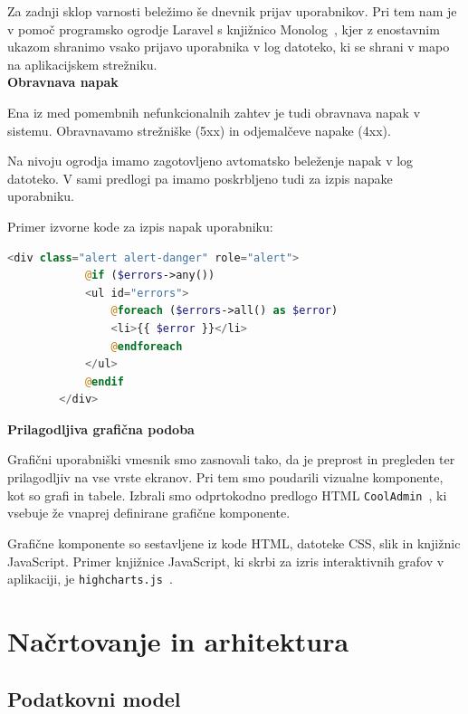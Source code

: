 \documentclass[a4paper, 12pt]{book}
\begin{document}
Za zadnji sklop varnosti beležimo še dnevnik prijav uporabnikov. Pri tem nam je v pomoč programsko ogrodje Laravel s knjižnico Monolog~\cite{laravel-monolog}, kjer z enostavnim ukazom shranimo vsako prijavo uporabnika v log datoteko, ki se shrani v mapo na aplikacijskem strežniku. \\

\noindent \textbf{Obravnava napak}

Ena iz med pomembnih nefunkcionalnih zahtev je tudi obravnava napak v sistemu. Obravnavamo strežniške (5xx) in odjemalčeve napake (4xx). 


Na nivoju ogrodja imamo zagotovljeno avtomatsko beleženje napak v log datoteko. V sami predlogi pa imamo poskrbljeno tudi za izpis napake uporabniku.

Primer izvorne kode za izpis napak uporabniku:

\begin{lstlisting}[language=PHP, style=mystyle]
        <div class="alert alert-danger" role="alert">
            @if ($errors->any())
            <ul id="errors">
                @foreach ($errors->all() as $error)
                <li>{{ $error }}</li>
                @endforeach
            </ul>
            @endif
        </div>
\end{lstlisting}

\vspace{5mm}

\noindent \textbf{Prilagodljiva grafična podoba}

Grafični uporabniški vmesnik smo zasnovali tako, da je preprost in pregleden ter prilagodljiv na vse vrste ekranov. Pri tem smo poudarili vizualne komponente, kot so grafi in tabele. Izbrali smo odprtokodno predlogo HTML {\tt CoolAdmin}~\cite{cooladmin-html-template}, ki vsebuje že vnaprej definirane grafične komponente.

Grafične komponente so sestavljene iz kode HTML, datoteke CSS, slik in knjižnic JavaScript.
Primer knjižnice JavaScript, ki skrbi za izris interaktivnih grafov v aplikaciji, je {\tt highcharts.js}~\cite{hightchars-js}.




\section{Načrtovanje in arhitektura}

\subsection{Podatkovni model}
\end{document}
